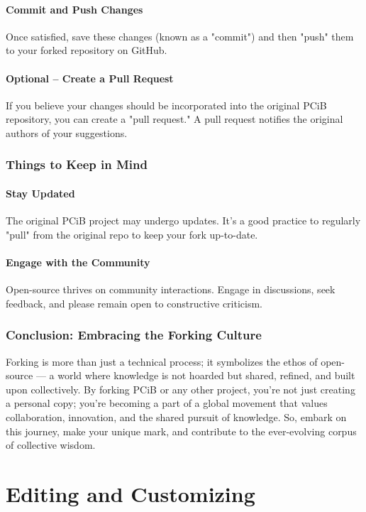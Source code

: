\documentclass[a4paper,12pt]{book}
\begin{document}
\subsubsection*{Commit and Push Changes}
Once satisfied, save these changes (known as a "commit") and then "push" them to your forked repository on GitHub.

\subsubsection*{Optional – Create a Pull Request}
If you believe your changes should be incorporated into the original PCiB repository, you can create a "pull request." A pull request notifies the original authors of your suggestions.

\subsection*{Things to Keep in Mind}
\subsubsection*{Stay Updated}
The original PCiB project may undergo updates. It's a good practice to regularly "pull" from the original repo to keep your fork up-to-date.

\subsubsection*{Engage with the Community}
Open-source thrives on community interactions. Engage in discussions, seek feedback, and please remain open to constructive criticism.

\subsection*{Conclusion: Embracing the Forking Culture}
Forking is more than just a technical process; it symbolizes the ethos of open-source — a world where knowledge is not hoarded but shared, refined, and built upon collectively. By forking PCiB or any other project, you're not just creating a personal copy; you're becoming a part of a global movement that values collaboration, innovation, and the shared pursuit of knowledge. So, embark on this journey, make your unique mark, and contribute to the ever-evolving corpus of collective wisdom.

\chapter{Editing and Customizing}
\end{document}
